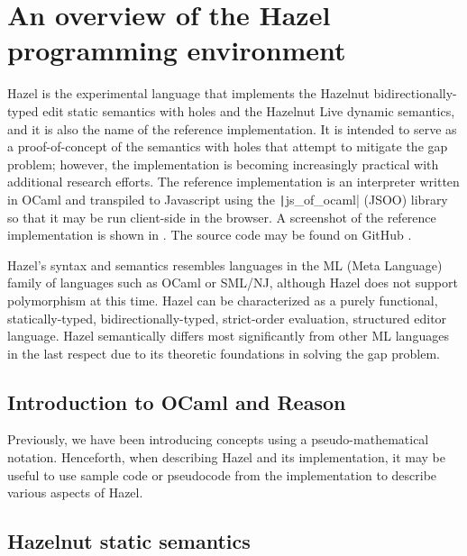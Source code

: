 \chapter{An overview of the Hazel programming environment}
\label{sec:hazel}


Hazel is the experimental language that implements the Hazelnut bidirectionally-typed edit static semantics with holes and the Hazelnut Live dynamic semantics, and it is also the name of the reference implementation. It is intended to serve as a proof-of-concept of the semantics with holes that attempt to mitigate the gap problem; however, the implementation is becoming increasingly practical with additional research efforts. The reference implementation is an interpreter written in OCaml and transpiled to Javascript using the \texttt|js_of_ocaml| (JSOO) library \cite{vouillon2014bytecode} so that it may be run client-side in the browser. A screenshot of the reference implementation is shown in  \cite{HazelDemo2022}. The source code may be found on GitHub \cite{Hazel2022}.

Hazel's syntax and semantics resembles languages in the ML (Meta Language) family of languages \cite{macqueen2020history} such as OCaml or SML/NJ, although Hazel does not support polymorphism at this time. Hazel can be characterized as a purely functional, statically-typed, bidirectionally-typed, strict-order evaluation, structured editor language. Hazel semantically differs most significantly from other ML languages in the last respect due to its theoretic foundations in solving the gap problem.

\section{Introduction to OCaml and Reason}
\label{sec:ocaml-intro}

Previously, we have been introducing concepts using a pseudo-mathematical notation. Henceforth, when describing Hazel and its implementation, it may be useful to use sample code or pseudocode from the implementation to describe various aspects of Hazel.


\section{Hazelnut static semantics}
\label{sec:statics}


